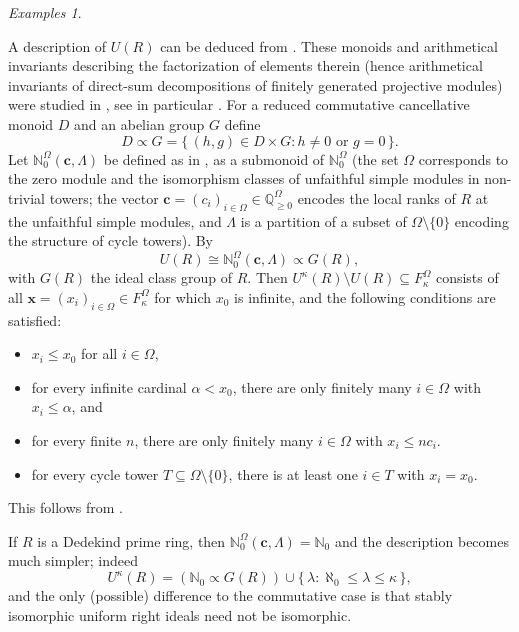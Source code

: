 \documentclass[a4paper,11pt,oneside]{amsart}
\theoremstyle{remark}
\newtheorem{examples}[teor]{Examples}
\newcommand{\bN}{\mathbb N}
\newcommand{\bQ}{\mathbb Q}
\begin{document}
\begin{examples}
\begin{enumerate}
    A description of $U(R)$ can be deduced from \cite[Chapter 6]{LevyRobson11}. These monoids and arithmetical invariants describing the factorization of elements therein (hence arithmetical invariants of direct-sum decompositions of finitely generated projective modules) were studied in \cite[Section 6]{BaethGeroldingerGrynkiewiczSmertnig15}, see in particular \cite[Theorem 6.5]{BaethGeroldingerGrynkiewiczSmertnig15}.
    For a reduced commutative cancellative monoid $D$ and an abelian group $G$ define
    \[
      D \propto G = \{\, (h,g) \in D \times G : h \ne 0 \text{ or } g = 0 \,\}.
    \]
    Let $\bN_0^{\Omega}(\mathbf c, \Lambda)$ be defined as in \cite[Definition 6.3]{BaethGeroldingerGrynkiewiczSmertnig15}, as a submonoid of $\bN_0^{\Omega}$ (the set $\Omega$ corresponds to the zero module and the isomorphism classes of unfaithful simple modules in non-trivial towers; the vector $\mathbf c=(c_i)_{i \in \Omega} \in \bQ_{\ge 0}^\Omega$ encodes the local ranks of $R$ at the unfaithful simple modules, and $\Lambda$ is a partition of a subset of $\Omega\setminus \{0\}$ encoding the structure of cycle towers).
    By \cite[Theorem 6.5]{BaethGeroldingerGrynkiewiczSmertnig15}
    \[
      U(R) \cong \bN_0^{\Omega}(\mathbf c, \Lambda) \propto G(R),
    \]
    with $G(R)$ the ideal class group of $R$.
    Then $U^{\kappa}(R) \setminus U(R) \subseteq F_{\kappa}^{\Omega}$ consists of all $\mathbf x=(x_i)_{i \in \Omega} \in F_{\kappa}^{\Omega}$ for which $x_0$ is infinite, and the following conditions are satisfied:
    \begin{itemize}
    \item $x_i \le x_0$ for all $i  \in \Omega$,
    \item for every infinite cardinal $\alpha < x_0$, there are only finitely many $i \in \Omega$ with $x_i \le \alpha$, and
    \item for every finite $n$, there are only finitely many $i \in \Omega$ with $x_i \le n c_i$.
    \item for every cycle tower $T \subseteq \Omega \setminus \{0\}$, there is at least one $i \in T$ with $x_i=x_0$.
    \end{itemize}
    This follows from \cite[Theorems 45.7, 45.13, and 46.1]{LevyRobson11}.

    If $R$ is a Dedekind prime ring, then $\bN_0^{\Omega}(\mathbf c, \Lambda)=\bN_0$ and the description becomes much simpler; indeed
    \[
      U^{\kappa}(R) = (\bN_0 \propto G(R)) \cup \{\, \lambda : \aleph_0 \le \lambda \le \kappa \,\},
    \]
    and the only (possible) difference to the commutative case is that stably isomorphic uniform right ideals need not be isomorphic.
  \end{enumerate}
\end{examples}
\end{document}

